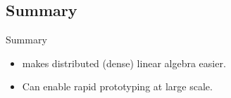 \subsection{Summary}
\makesubcontentsslidessec


\begin{frame}
  \begin{block}{Summary}
    \begin{itemize}
      \item {} makes distributed (dense) linear algebra easier.
      \item Can enable rapid prototyping at large scale.
    \end{itemize}
  \end{block}
\end{frame}